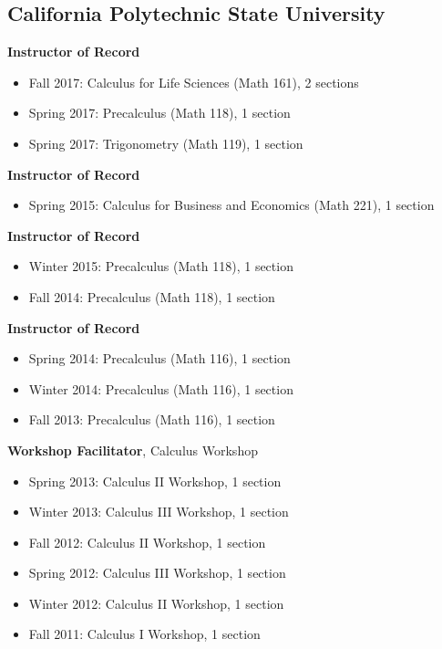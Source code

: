 \subsection*{California Polytechnic State University}

 \textbf{Instructor of Record}
\begin{itemize}
    \item Fall 2017: Calculus for Life Sciences (Math 161), 2 sections
    \item Spring 2017: Precalculus (Math 118), 1 section
    \item Spring 2017: Trigonometry (Math 119), 1 section
\end{itemize}

 \textbf{Instructor of Record}
\begin{itemize}
    \item Spring 2015: Calculus for Business and Economics (Math 221), 1 section
\end{itemize}

 \textbf{Instructor of Record}
\begin{itemize}
    \item Winter 2015: Precalculus (Math 118), 1 section
    \item Fall 2014: Precalculus (Math 118), 1 section
\end{itemize}

 \textbf{Instructor of Record}
\begin{itemize}
    \item Spring 2014: Precalculus (Math 116), 1 section
    \item Winter 2014: Precalculus (Math 116), 1 section
    \item Fall 2013: Precalculus (Math 116), 1 section
\end{itemize}

 \textbf{Workshop Facilitator}, Calculus Workshop
\begin{itemize}
    \item Spring 2013: Calculus II Workshop, 1 section
    \item Winter 2013: Calculus III Workshop, 1 section
    \item Fall 2012: Calculus II Workshop, 1 section
    \item Spring 2012: Calculus III Workshop, 1 section
    \item Winter 2012: Calculus II Workshop, 1 section
    \item Fall 2011: Calculus I Workshop, 1 section
\end{itemize}

